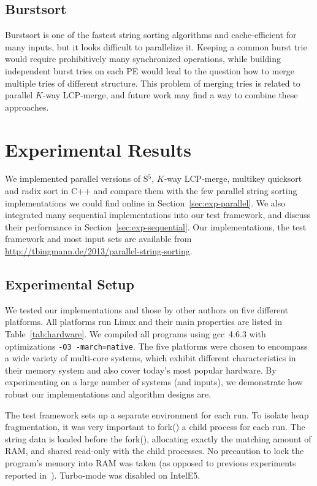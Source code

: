 \documentclass[a4paper]{myjournal}
\begin{document}
\subsection{Burstsort}\label{sec:para-burstsort}

Burstsort is one of the fastest string sorting algorithms and cache-efficient
for many inputs, but it looks difficult to parallelize it. Keeping a common
burst trie would require prohibitively many synchronized operations, while
building independent burst tries on each PE would lead to the question how to
merge multiple tries of different structure.  This problem of merging tries is
related to parallel $K$-way LCP-merge, and future work may find a way to combine
these approaches.

\section{Experimental Results}\label{sec:experiments}

We implemented parallel versions of S$^5$, $K$-way LCP-merge, multikey quicksort
and radix sort in C++ and compare them with the few parallel string sorting
implementations we could find online in Section~\ref{sec:exp-parallel}.  We also
integrated many sequential implementations into our test framework, and discuss
their performance in Section~\ref{sec:exp-sequential}. Our implementations, the
test framework and most input sets are available from
\url{http://tbingmann.de/2013/parallel-string-sorting}.

\subsection{Experimental Setup}\label{sec:exp-setup}

We tested our implementations and those by other authors on five different
platforms.  All platforms run Linux and their main properties are listed in
Table~\ref{tab:hardware}.  We compiled all programs using gcc~4.6.3 with
optimizations \texttt{-O3 -march=native}.  The five platforms were chosen to
encompass a wide variety of multi-core systems, which exhibit different
characteristics in their memory system and also cover today's most popular
hardware.  By experimenting on a large number of systems (and inputs), we
demonstrate how robust our implementations and algorithm designs are.

The test framework sets up a separate environment for each run.  To isolate heap
fragmentation, it was very important to fork() a child process for each run.
The string data is loaded before the fork(), allocating exactly the matching
amount of RAM, and shared read-only with the child processes. No precaution to
lock the program's memory into RAM was taken (as opposed to previous experiments
reported in~\cite{bingmann2013parallel}). Turbo-mode was disabled on IntelE5.
\end{document}
